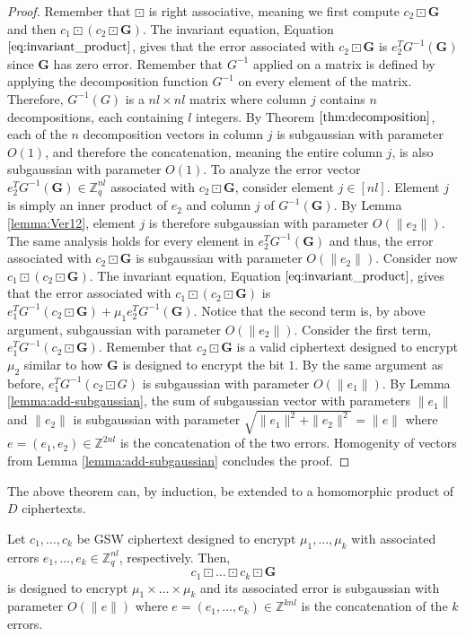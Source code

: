 \begin{proof}
    Remember that $\boxdot$ is right associative, meaning we first compute $c_2 \boxdot \mathbf{G}$ and then $c_1 \boxdot (c_2 \boxdot \mathbf{G})$. The invariant equation, Equation $\ref{eq:invariant_product}$, gives that the error associated with $c_2 \boxdot \mathbf{G}$ is $e_2^TG^{-1}(\mathbf{G})$ since $\mathbf{G}$ has zero error. Remember that $G^{-1}$ applied on a matrix is defined by applying the decomposition function $G^{-1}$ on every element of the matrix. Therefore, $G^{-1}(G)$ is a $nl \times nl$ matrix where column $j$ contains $n$ decompositions, each containing $l$ integers. By Theorem $\ref{thm:decomposition}$, each of the $n$ decomposition vectors in column $j$ is subgaussian with parameter $O(1)$, and therefore the concatenation, meaning the entire column $j$, is also subgaussian with parameter $O(1)$. To analyze the error vector $e_2^TG^{-1}(\mathbf{G}) \in \mathbb{Z}_q^{nl}$ associated with $c_2 \boxdot \mathbf{G}$, consider element $j \in [nl]$. Element $j$ is simply an inner product of $e_2$ and column $j$ of $G^{-1}(\mathbf{G})$. By Lemma \ref{lemma:Ver12}, element $j$ is therefore subgaussian with parameter $O(\|e_2\|)$. The same analysis holds for every element in $e_2^TG^{-1}(\mathbf{G})$ and thus, the error associated with $c_2 \boxdot \mathbf{G}$ is subgaussian with parameter $O(\| e_2 \|)$.
    Consider now $c_1 \boxdot (c_2 \boxdot \mathbf{G})$. The invariant equation, Equation $\ref{eq:invariant_product}$, gives that the error associated with $c_1 \boxdot (c_2 \boxdot \mathbf{G})$ is $e_1^TG^{-1}(c_2 \boxdot \mathbf{G}) + \mu_1 e_2^TG^{-1}(\mathbf{G})$. Notice that the second term is, by above argument, subgaussian with parameter $O(\|e_2\|)$. Consider the first term, $e_1^TG^{-1}(c_2 \boxdot \mathbf{G})$. Remember that $c_2 \boxdot \mathbf{G}$ is a valid ciphertext designed to encrypt $\mu_2$ similar to how $\mathbf{G}$ is designed to encrypt the bit $1$. By the same argument as before, $e_1^TG^{-1}(c_2 \boxdot G)$ is subgaussian with parameter $O(\|e_1\|)$. By Lemma \ref{lemma:add-subgaussian}, the sum of subgaussian vector with parameters $\|e_1\|$ and $\|e_2\|$ is subgaussian with parameter $\sqrt{\|e_1\|^2 + \|e_2\|^2} = \|e\|$ where $e = (e_1, e_2) \in \mathbb{Z}^{2nl}$ is the concatenation of the two errors. Homogenity of vectors from Lemma \ref{lemma:add-subgaussian} concludes the proof.
\end{proof}
The above theorem can, by induction, be extended to a homomorphic product of $D$ ciphertexts. 
\begin{corollary}\label{cor:hom_product}
    Let $c_1, \dots, c_k$ be GSW ciphertext designed to encrypt $\mu_1, \dots, \mu_k$ with associated errors $e_1, \dots, e_k \in \mathbb{Z}_q^{nl}$, respectively. Then,
    \begin{equation}
        c_1 \boxdot \dots \boxdot c_k \boxdot \mathbf{G} 
    \end{equation}
    is designed to encrypt $\mu_1 \times \dots \times \mu_k$ and its associated error is subgaussian with parameter $O(\|e\|)$ where $e = (e_1, \dots, e_k) \in \mathbb{Z}^{knl}$ is the concatenation of the $k$ errors.
\end{corollary}
